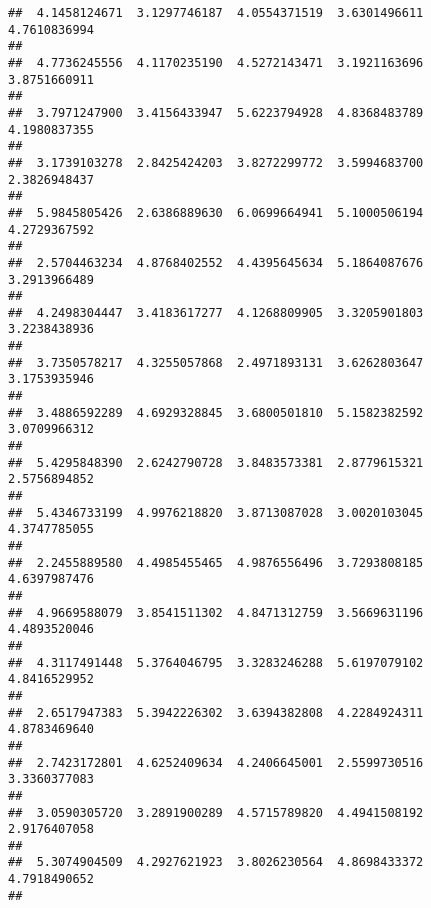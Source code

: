 \documentclass[]{article}
\begin{document}
\begin{verbatim}
##  4.1458124671  3.1297746187  4.0554371519  3.6301496611  4.7610836994 
##                                                                       
##  4.7736245556  4.1170235190  4.5272143471  3.1921163696  3.8751660911 
##                                                                       
##  3.7971247900  3.4156433947  5.6223794928  4.8368483789  4.1980837355 
##                                                                       
##  3.1739103278  2.8425424203  3.8272299772  3.5994683700  2.3826948437 
##                                                                       
##  5.9845805426  2.6386889630  6.0699664941  5.1000506194  4.2729367592 
##                                                                       
##  2.5704463234  4.8768402552  4.4395645634  5.1864087676  3.2913966489 
##                                                                       
##  4.2498304447  3.4183617277  4.1268809905  3.3205901803  3.2238438936 
##                                                                       
##  3.7350578217  4.3255057868  2.4971893131  3.6262803647  3.1753935946 
##                                                                       
##  3.4886592289  4.6929328845  3.6800501810  5.1582382592  3.0709966312 
##                                                                       
##  5.4295848390  2.6242790728  3.8483573381  2.8779615321  2.5756894852 
##                                                                       
##  5.4346733199  4.9976218820  3.8713087028  3.0020103045  4.3747785055 
##                                                                       
##  2.2455889580  4.4985455465  4.9876556496  3.7293808185  4.6397987476 
##                                                                       
##  4.9669588079  3.8541511302  4.8471312759  3.5669631196  4.4893520046 
##                                                                       
##  4.3117491448  5.3764046795  3.3283246288  5.6197079102  4.8416529952 
##                                                                       
##  2.6517947383  5.3942226302  3.6394382808  4.2284924311  4.8783469640 
##                                                                       
##  2.7423172801  4.6252409634  4.2406645001  2.5599730516  3.3360377083 
##                                                                       
##  3.0590305720  3.2891900289  4.5715789820  4.4941508192  2.9176407058 
##                                                                       
##  5.3074904509  4.2927621923  3.8026230564  4.8698433372  4.7918490652 
##                                                                       

\end{verbatim}
\end{document}
